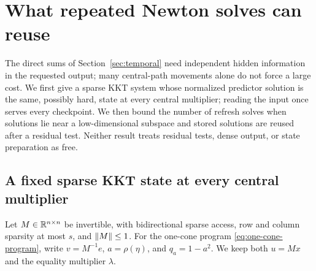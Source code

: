 \section{What repeated Newton solves can reuse}\label{sec:reuse}
The direct sums of Section~\ref{sec:temporal} need independent hidden
information in the requested output; many central-path movements alone do
not force a large cost.  We first give a sparse KKT system whose normalized
predictor solution is the same, possibly hard, state at every central
multiplier; reading the input once serves every checkpoint.  We then
bound the number of refresh solves when solutions lie near a low-dimensional subspace and stored solutions are reused after
a residual test.  Neither result treats residual tests, dense output, or
state preparation as free.

\subsection{A fixed sparse KKT state at every central multiplier}
Let $M\in\mathbb R^{n\times n}$ be invertible, with bidirectional sparse access,
row and column sparsity at most $s$, and $\left\lVert M\right\rVert\leq1$.
For the one-cone program \eqref{eq:one-cone-program}, write
$v=M^{-1}e$, $a=\rho(\eta)$, and $q_a=1-a^2$.
We keep both $u=Mx$ and the equality multiplier $\lambda$.

